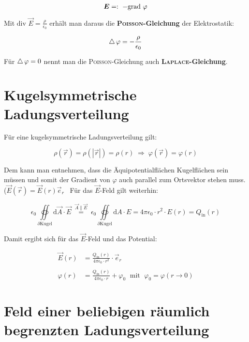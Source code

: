 \begin{equation*}
\bm{E} =: \ -\text{grad } \varphi
\end{equation*}

Mit div $\vec{E} = \frac{\rho}{\epsilon_0}$ erhält man daraus die \textbf{\textsc{Poisson}-Gleichung} der Elektrostatik:

\begin{equation*}
\mathop{{}\bigtriangleup}\nolimits\varphi = - \frac{\rho}{\epsilon_0}
\end{equation*}

Für $\mathop{{}\bigtriangleup}\nolimits\varphi = 0$ nennt man die \textsc{Poisson}-Gleichung auch \textbf{\textsc{Laplace}-Gleichung}.

\section{Kugelsymmetrische Ladungsverteilung}

Für eine kugelsymmetrische Ladungsverteilung gilt:

\begin{equation*}
\rho(\vec{r}) = \rho(|\vec{r}|) = \rho(r) \; \Rightarrow \; \varphi(\vec{r}) = \varphi(r)
\end{equation*}

Dem kann man entnehmen, dass die Äquipotentialflächen Kugelflächen sein müssen und somit der Gradient von $\varphi$ auch parallel zum Ortsvektor stehen muss.($\vec{E}(\vec{r}) = \vec{E}(r)\vec{e}_r$ \
Für das $\vec{E}$-Feld gilt weiterhin:

\begin{equation*}
\epsilon_0\oiint\limits_{\partial \text{Kugel}}\mathrm{d}\vec{A}\cdot\vec{E} \; \overset{\vec{A}\parallel\vec{E}}{=} \; \epsilon_0\oiint\limits_{\partial \text{Kugel}}\mathrm{d} A \cdot E = 4\pi\epsilon_0\cdot r^2 \cdot E(r) = Q_{\mathrm{in}}(r)
\end{equation*}

Damit ergibt sich für das $\vec{E}$-Feld und das Potential:

\begin{align*}
\vec{E}(r) &= \frac{Q_{\mathrm{in}}(r)}{4\pi\epsilon_0\cdot r^2} \cdot \vec{e}_r\\
\ \\
\varphi(r) &= \frac{Q_{\mathrm{in}}(r)}{4\pi\epsilon_0\cdot r} + \varphi_0 \; \text{ mit } \; \varphi_0 = \varphi(r \rightarrow 0)
\end{align*}

\section{Feld einer beliebigen räumlich begrenzten Ladungsverteilung}

